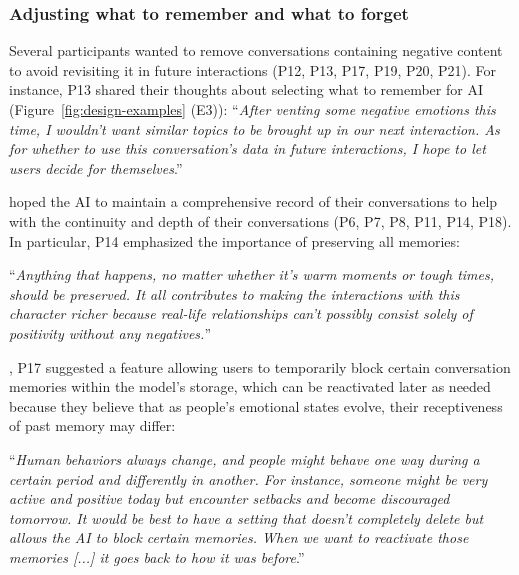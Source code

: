 \subsubsection{Adjusting what to remember and what to forget }
Several participants wanted to remove conversations containing negative content to avoid revisiting it in future interactions (P12, P13, P17, P19, P20, P21). For instance, P13 shared their thoughts about selecting what to remember for AI (Figure~\ref{fig:design-examples} (E3)):  %
``\textit{After venting some negative emotions this time, I wouldn't want similar topics to be brought up in our next interaction. As for whether to use this conversation's data in future interactions, I hope to let users decide for themselves}.'' 

 hoped the AI to maintain a comprehensive record of their conversations to help with the continuity and depth of their conversations (P6, P7, P8, P11, P14, P18). In particular, P14 emphasized the importance of preserving all memories: %

``\textit{Anything that happens, no matter whether it's warm moments or tough times, should be preserved. It all contributes to making the interactions with this character richer because real-life relationships can't possibly consist solely of positivity without any negatives.}''

, P17 suggested a feature allowing users to temporarily block certain conversation memories within the model's storage, which can be reactivated later as needed because they believe that as people's emotional states evolve, their receptiveness of past memory may differ: %

``\textit{Human behaviors always change, and people might behave one way during a certain period and differently in another. For instance, someone might be very active and positive today but encounter setbacks and become discouraged tomorrow. It would be best to have a setting that doesn't completely delete but allows the AI to block certain memories. When we want to reactivate those memories [...] it goes back to how it was before}.'' 

